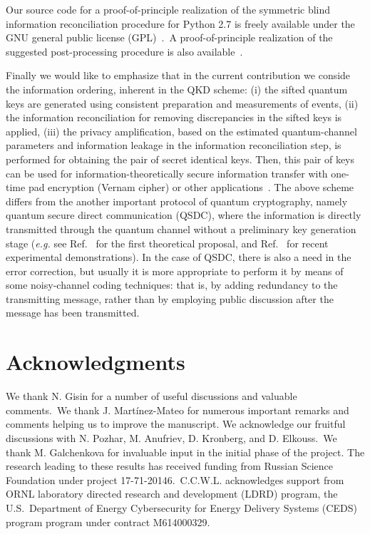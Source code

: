 \documentclass[aps,pra,twocolumn,amsmath,amssymb,nofootinbib,showpacs,superscriptaddress]{revtex4-1}
\begin{document}
Our source code for a proof-of-principle realization of the symmetric blind information reconciliation procedure 
for Python 2.7 is freely available under the GNU general public license (GPL)~\cite{Code}.~A proof-of-principle realization of the suggested post-processing procedure is also available~\cite{Code2}.

Finally we would like to emphasize that in the current contribution we conside the information ordering, inherent in the QKD scheme: 
(i) the sifted quantum keys are generated using consistent preparation and measurements of events, 
(ii) the information reconciliation for removing discrepancies in the sifted keys is applied, 
(iii) the privacy amplification, based on the estimated quantum-channel parameters and information leakage in the information reconciliation step, is performed for obtaining the pair of secret identical keys.
Then, this pair of keys can be used for information-theoretically secure information transfer with one-time pad encryption (Vernam cipher) or other applications~\cite{Alleaume}.
The above scheme differs from the another important protocol of quantum cryptography, namely quantum secure direct communication (QSDC), 
where the information is directly transmitted through the quantum channel without a preliminary key generation stage (\emph{e.g.} see Ref.~\cite{QSDC1} for the first theoretical proposal, 
and Ref.~\cite{QSDC2,QSDC3} for recent experimental demonstrations).
In the case of QSDC, there is also a need in the error correction, but usually it is more appropriate to perform it by means of some noisy-channel coding techniques: 
that is, by adding redundancy to the transmitting message, rather than by employing public discussion after the message has been transmitted.  

\section*{Acknowledgments}
We thank N. Gisin for a number of useful discussions and valuable comments.~We thank J. Mart\'inez-Mateo for numerous important remarks and comments helping us to improve the manuscript. 
We acknowledge our fruitful discussions with N. Pozhar, M. Anufriev, D. Kronberg, and D. Elkouss.~We thank M. Galchenkova for invaluable input in the initial phase of the project. 
The research leading to these results has received funding from Russian Science Foundation under project 17-71-20146.~C.C.W.L. acknowledges support from ORNL laboratory directed research and development (LDRD) program, 
the U.S.~Department of Energy Cybersecurity for Energy Delivery Systems (CEDS) program program under contract M614000329.
\end{document}
